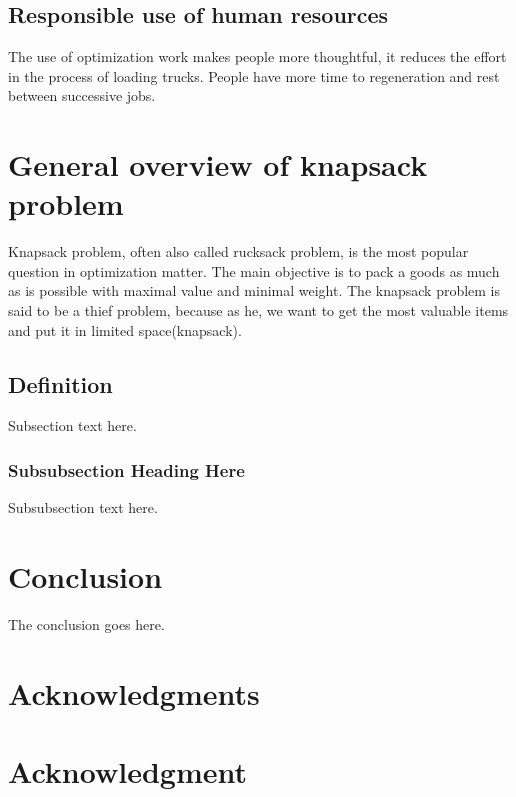\documentclass[conference,compsoc]{IEEEtran}
\begin{document}
\subsection{Responsible use of human resources}
The use of optimization work makes people more thoughtful, it reduces the effort in the process of loading trucks. People have more time to regeneration and rest between successive jobs.

\section{General overview of knapsack problem}
Knapsack problem, often also called rucksack problem, is the most popular question in optimization matter. The main objective is to pack a goods as much as is possible with maximal value and minimal weight. The knapsack problem is said to be a thief problem, because as he, we want to get the most valuable items and put it in limited space(knapsack).

\subsection{Definition}
Subsection text here.


\subsubsection{Subsubsection Heading Here}
Subsubsection text here.






\section{Conclusion}
The conclusion goes here.







\ifCLASSOPTIONcompsoc
  \section*{Acknowledgments}
\else
  \section*{Acknowledgment}
\fi
\end{document}
